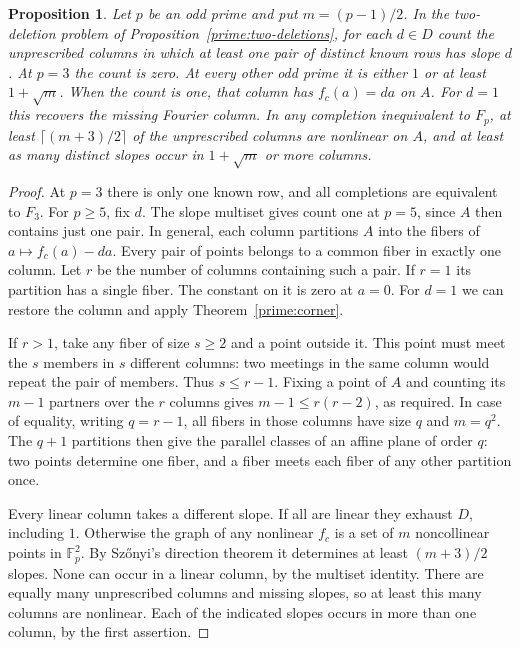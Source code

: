\documentclass[11pt,a4paper]{article}
\newtheorem{proposition}[theorem]{Proposition}
\numberwithin{equation}{section}
\begin{document}
\begin{proposition}\label{prime:joint-slopes}
Let $p$ be an odd prime and put $m=(p-1)/2$. In the two-deletion problem of Proposition~\ref{prime:two-deletions}, for each $d\in D$ count the unprescribed columns in which at least one pair of distinct known rows has slope $d$. At $p=3$ the count is zero. At every other odd prime it is either $1$ or at least $1+\sqrt m$. When the count is one, that column has $f_c(a)=da$ on $A$. For $d=1$ this recovers the missing Fourier column. In any completion inequivalent to $F_p$, at least $\lceil(m+3)/2\rceil$ of the unprescribed columns are nonlinear on $A$, and at least as many distinct slopes occur in $1+\sqrt m$ or more columns.
\end{proposition}
\begin{proof}
At $p=3$ there is only one known row, and all completions are equivalent to $F_3$. For $p\ge5$, fix $d$. The slope multiset gives count one at $p=5$, since $A$ then contains just one pair. In general, each column partitions $A$ into the fibers of $a\mapsto f_c(a)-da$. Every pair of points belongs to a common fiber in exactly one column. Let $r$ be the number of columns containing such a pair. If $r=1$ its partition has a single fiber. The constant on it is zero at $a=0$. For $d=1$ we can restore the column and apply Theorem~\ref{prime:corner}.

If $r>1$, take any fiber of size $s\ge2$ and a point outside it. This point must meet the $s$ members in $s$ different columns: two meetings in the same column would repeat the pair of members. Thus $s\le r-1$. Fixing a point of $A$ and counting its $m-1$ partners over the $r$ columns gives $m-1\le r(r-2)$, as required. In case of equality, writing $q=r-1$, all fibers in those columns have size $q$ and $m=q^2$. The $q+1$ partitions then give the parallel classes of an affine plane of order $q$: two points determine one fiber, and a fiber meets each fiber of any other partition once.

Every linear column takes a different slope. If all are linear they exhaust $D$, including $1$. Otherwise the graph of any nonlinear $f_c$ is a set of $m$ noncollinear points in $\mathbb F_p^2$. By Sz\H{o}nyi's direction theorem \cite[Theorem~5.2]{szonyi} it determines at least $(m+3)/2$ slopes. None can occur in a linear column, by the multiset identity. There are equally many unprescribed columns and missing slopes, so at least this many columns are nonlinear. Each of the indicated slopes occurs in more than one column, by the first assertion.
\end{proof}
\end{document}
